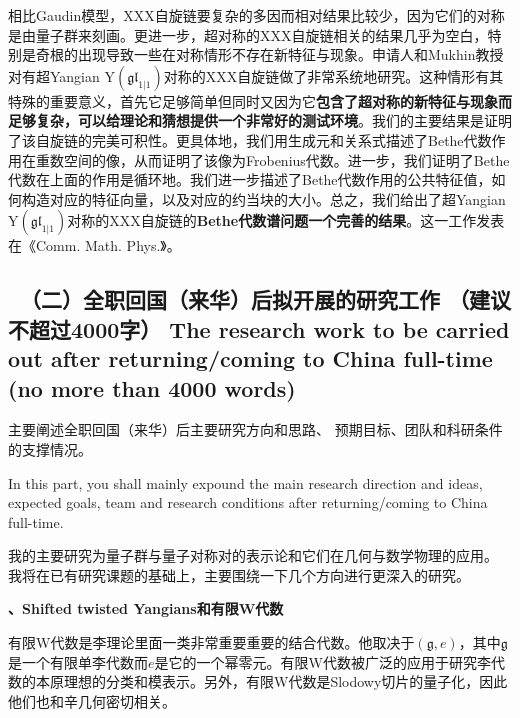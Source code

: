 \documentclass[12pt,UTF8,AutoFakeBold=4,a4paper]{ctexart}
\begin{document}
相比Gaudin模型，XXX自旋链要复杂的多因而相对结果比较少，因为它们的对称是由量子群来刻画。更进一步，超对称的XXX自旋链相关的结果几乎为空白，特别是奇根的出现导致一些在对称情形不存在新特征与现象。申请人和Mukhin教授对有超Yangian $\mathrm{Y}(\mathfrak{gl}_{1|1})$对称的XXX自旋链做了非常系统地研究。这种情形有其特殊的重要意义，首先它足够简单但同时又因为它\textbf{包含了超对称的新特征与现象而足够复杂，可以给理论和猜想提供一个非常好的测试环境}。我们的主要结果是证明了该自旋链的完美可积性。更具体地，我们用生成元和关系式描述了Bethe代数作用在重数空间的像，从而证明了该像为Frobenius代数。进一步，我们证明了Bethe代数在上面的作用是循环地。我们进一步描述了Bethe代数作用的公共特征值，如何构造对应的特征向量，以及对应的约当块的大小。总之，我们给出了超Yangian $\mathrm{Y}(\mathfrak{gl}_{1|1})$对称的XXX自旋链的\textbf{Bethe代数谱问题一个完善的结果}。这一工作发表在《Comm. Math. Phys.》。

{\color{MsBlue} \subsection{\sihao \kaishu \qquad \ 
\textbf{（二）全职回国（来华）后拟开展的研究工作} {\normalfont（建议不超过4000字）} 
\bfseries \xiaosihao {} 
The research work to 
be carried out after returning/coming to China full-time (no more than 4000 words)} 
}

 

{\sihao \color{MsBlue} \kaishu 主要阐述全职回国（来华）后主要研究方向和思路、
预期目标、团队和科研条件的支撑情况。}

\medskip

{\color{MsBlue}  
In this part, you shall mainly expound the main research direction and ideas, 
expected goals, team and research conditions after returning/coming to China 
full-time.}

\medskip

我的主要研究为量子群与量子对称对的表示论和它们在几何与数学物理的应用。 我将在已有研究课题的基础上，主要围绕一下几个方向进行更深入的研究。

\textbf{、Shifted twisted Yangians和有限W代数}

有限W代数是李理论里面一类非常重要重要的结合代数。他取决于$(\mathfrak g,e)$，其中$\mathfrak g$是一个有限单李代数而$e$是它的一个幂零元。有限W代数被广泛的应用于研究李代数的本原理想的分类和模表示。另外，有限W代数是Slodowy切片的量子化，因此他们也和辛几何密切相关。
\end{document}
